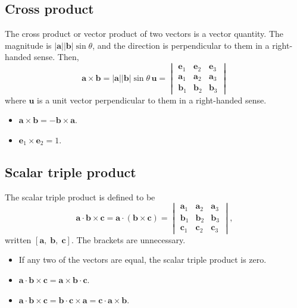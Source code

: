 \subsection{Cross product}
The cross product or vector product of two vectors is a vector quantity. 
The magnitude is $|\bm{a}| |\bm{b}| \sin \theta$, and the direction is perpendicular to them in a right-handed sense. 
Then,
\begin{equation}
    \bm{a} \times \bm{b} 
    = |\bm{a}| |\bm{b}| \sin \theta\,\bm{u}
    =   
        \begin{vmatrix}
            \bm{e}_1 & \bm{e}_2 & \bm{e}_3 \\
            \bm{a}_1 & \bm{a}_2 & \bm{a}_3 \\
            \bm{b}_1 & \bm{b}_2 & \bm{b}_3 
        \end{vmatrix}
\end{equation}
where $\bm{u}$ is a unit vector perpendicular to them in a right-handed sense. 
\begin{itemize}
    \item $\bm{a} \times \bm{b} = - \bm{b} \times \bm{a}$.
    \item $\bm{e}_1 \times \bm{e}_2 = 1$. 
\end{itemize}

\subsection{Scalar triple product}
The scalar triple product is defined to be 
\begin{equation}
    \bm{a} \cdot \bm{b} \times \bm{c}
    =
    \bm{a} \cdot (\bm{b} \times \bm{c})
    =
        \begin{vmatrix}
            \bm{a}_1 & \bm{a}_2 & \bm{a}_3 \\
            \bm{b}_1 & \bm{b}_2 & \bm{b}_3 \\
            \bm{c}_1 & \bm{c}_2 & \bm{c}_3 
        \end{vmatrix}
    ,
\end{equation}
written $[\bm{a},\;\bm{b},\;\bm{c}]$. The brackets are unnecessary.

\begin{itemize}
    \item If any two of the vectors are equal, the scalar triple product is zero.
    \item $ \bm{a} \cdot \bm{b} \times \bm{c}
            = \bm{a} \times \bm{b} \cdot \bm{c} $.
    \item $ \bm{a} \cdot \bm{b} \times \bm{c}
            = \bm{b} \cdot \bm{c} \times \bm{a} 
            = \bm{c} \cdot \bm{a} \times \bm{b} $.
\end{itemize}

